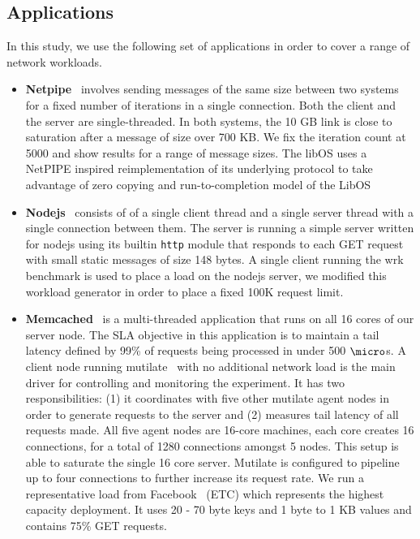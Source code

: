 \subsection{Applications}
\label{sec:apps}
In this study, we use the following set of applications in order to cover a
range of network workloads.
\begin{itemize}
\item \textbf{Netpipe}~\cite{snell1996netpipe} involves sending messages of the
same size between two systems for a fixed number of iterations in a single
connection. Both the client and the server are single-threaded. In both
systems, the 10 GB link is close to saturation after a message of size over 700
KB. We fix the iteration count at 5000 and show results for a range of message
sizes. The libOS uses a NetPIPE inspired reimplementation of its underlying protocol to take advantage of zero copying and run-to-completion model of the LibOS

\item \textbf{Nodejs}~\cite{nodejs} consists of of a single client thread and a
single server thread with a single connection between them. The server is
running a simple server written for nodejs using its builtin \texttt{http}
module that responds to each GET request with small static messages of size 148
bytes. A single client running the wrk~\cite{wrk} benchmark is used to place a
load on the nodejs server, we modified this workload generator in order to place a fixed
100K request limit.

\item \textbf{Memcached}~\cite{mcd} is a multi-threaded application that runs
on all 16 cores of our server node.
The SLA objective in this application is to maintain a tail latency defined by
99\% of requests being processed in under 500 $\micro$s.
A client node running mutilate~\cite{mutilate} with no additional network load
is the main driver for controlling and monitoring the experiment.
It has two responsibilities: (1) it coordinates with five other mutilate agent
nodes in order to generate requests to the server and (2) measures tail latency
of all requests made.
All five agent nodes are 16-core
machines, each core creates 16 connections, for a total of 1280 connections
amongst 5 nodes. This setup is able to saturate the single 16 core server.
Mutilate is configured to pipeline up to four connections to further increase
its request rate.
We run a representative load from Facebook~\cite{workloadanalysisfacebook}
(ETC) which represents the highest capacity deployment. It uses 20 - 70 byte
keys and 1 byte to 1 KB values and contains 75\% GET requests.
	

\end{itemize}
